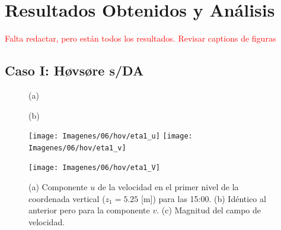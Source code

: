 \chapter{Resultados Obtenidos y Análisis}
\textcolor{red}{Falta redactar, pero están todos los resultados. Revisar captions de figuras}
\section{Caso I: Høvsøre s/DA}
\newpage
\begin{figure}[H]
	\centering
	\begin{minipage}{0.5\linewidth}
		\center\hspace{0.3cm}(a)
	\end{minipage}%
	\begin{minipage}{0.5\linewidth}
		\center\hspace{0.3cm}(b)
	\end{minipage}%
	
	\texttt{[image: Imagenes/06/hov/eta1\_u]}%
	\texttt{[image: Imagenes/06/hov/eta1\_v]}%
	
	
	\texttt{[image: Imagenes/06/hov/eta1\_V]}%
	\caption{(a) Componente $u$ de la velocidad en el primer nivel de la coordenada vertical ($z_1=5.25$ [m]) para las 15:00. (b) Idéntico al anterior pero para la componente $v$. (c) Magnitud del campo de velocidad.}
	\label{fig:06_hov_eta1}
\end{figure}


